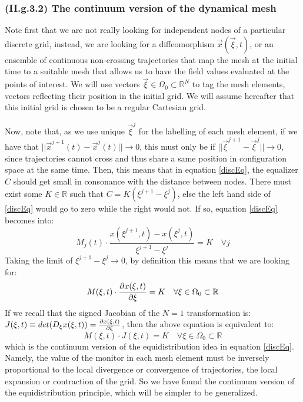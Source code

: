 \documentclass[11pt, a4paper]{article} %
\newcommand{\R}{\mathbb{R}} %
\begin{document}
\subsubsection*{(II.g.3.2) The continuum version of the dynamical mesh\vspace{-0.2cm}}
Note first that we are not really looking for independent nodes of a particular discrete grid, instead, we are looking for a diffeomorphism $\vec{x}(\vec{\xi},t)$, or an ensemble of continuous non-crossing trajectories that map the mesh at the initial time to a suitable mesh that allows us to have the field values evaluated at the points of interest. We will use vectors $\vec{\xi}\in\Omega_0\subset\R^N$ to tag the mesh elements, vectors reflecting their position in the initial grid. We will assume hereafter that this initial grid is chosen to be a regular Cartesian grid.

Now, note that, as we use unique $\vec{\xi}^j$ for the labelling of each mesh element, if we have that $||\vec{x}^{j+1}(t)-\vec{x}^j(t)||\rightarrow 0$, this must only be if $||\vec{\xi}^{j+1}-\vec{\xi}^j||\rightarrow 0$, since trajectories cannot cross and thus share a same position in configuration space at the same time. Then, this means that in equation \eqref{discEq}, the equalizer $C$ should get small in consonance with the distance between nodes. There must exist some $K\in\R$ such that $C=K(\xi^{j+1}-\xi^j)$, else the left hand side of \eqref{discEq} would go to zero while the right would not. If so, equation \eqref{discEq} becomes into:
\begin{equation}
M_j(t)\cdot \frac{x(\xi^{j+1},t)-x(\xi^{j},t)}{\xi^{j+1}-\xi^j}=K \quad \forall j
\end{equation}
Taking the limit of $\xi^{j+1}-\xi^j\rightarrow 0$, by definition this means that we are looking for:
\begin{equation}\label{contEq}
M(\xi,t)\cdot \pdv{x(\xi,t)}{\xi}=K \quad \forall \xi\in \Omega_0\subset \R
\end{equation}
If we recall that the signed Jacobian of the $N=1$ transformation is: $J(\xi,t)\equiv det(D_{\xi}x(\xi,t))=\pdv{x(\xi,t)}{\xi}$, then the above equation is equivalent to:
\begin{equation}
M(\xi,t)\cdot J(\xi,t)=K \quad \forall \xi\in \Omega_0\subset \R
\end{equation}
which is the continuum version of the equidistribution idea in equation \eqref{discEq}. Namely, the value of the monitor in each mesh element must be inversely proportional to the local divergence or convergence of trajectories, the local expansion or contraction of the grid. So we have found the continuum version of the equidistribution principle, which will be simpler to be generalized.
\end{document}
